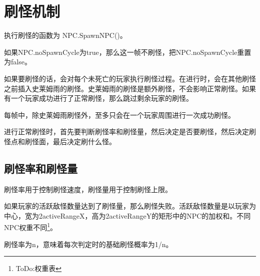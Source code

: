\chapter{刷怪机制}
执行刷怪的函数为 NPC.SpawnNPC()。

如果NPC.noSpawnCycle为true，那么这一帧不刷怪，把NPC.noSpawnCycle重置为false。

如果要刷怪的话，会对每个未死亡的玩家执行刷怪过程。在进行时，会在其他刷怪之前插入史莱姆雨的刷怪。史莱姆雨的刷怪是额外刷怪，不会影响正常刷怪。如果有一个玩家成功进行了正常刷怪，那么跳过剩余玩家的刷怪。

\begin{remark}
每帧中，除史莱姆雨刷怪外，至多只会在一个玩家周围进行一次成功刷怪。
\end{remark}

进行正常刷怪时，首先要判断刷怪率和刷怪量，然后决定是否要刷怪，然后决定刷怪点和刷怪面，最后决定刷什么怪。

\minitoc

\section{刷怪率和刷怪量}
刷怪率用于控制刷怪速度，刷怪量用于控制刷怪上限。

如果玩家的活跃敌怪数量达到了刷怪量，那么刷怪失败。活跃敌怪数量是以玩家为中心，宽为2activeRangeX，高为2activeRangeY的矩形中的NPC的加权和。不同NPC权重不同\footnote{ToDo:权重表}。

刷怪率为n，意味着每次判定时的基础刷怪概率为1/n。

